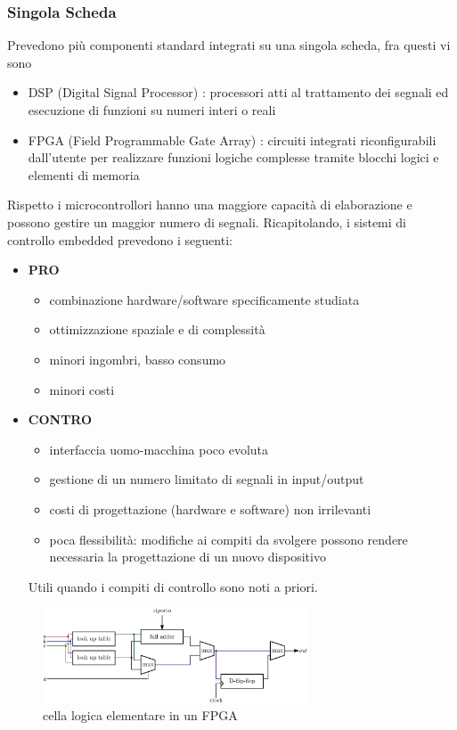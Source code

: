 \documentclass[10pt, letterpaper]{report}
\begin{document}
\subsubsection{Singola Scheda}
Prevedono più componenti standard integrati su una singola scheda, fra questi vi sono\begin{itemize}
    \item DSP (Digital Signal Processor) : processori atti al trattamento dei segnali ed esecuzione di funzioni su numeri interi o reali 
    \item FPGA (Field Programmable Gate Array) : circuiti integrati riconfigurabili dall’utente per realizzare 
    funzioni logiche complesse tramite blocchi logici e elementi di memoria
\end{itemize}
Rispetto i microcontrollori hanno una maggiore capacità di elaborazione e possono gestire un maggior numero 
di segnali.\acc 
Ricapitolando, i sistemi di controllo embedded prevedono i seguenti:\begin{itemize}
    \item \textbf{PRO}\begin{itemize}
        \item combinazione hardware/software specificamente studiata 
        \item ottimizzazione spaziale e di complessità
        \item minori ingombri, basso consumo 
        \item minori costi
    \end{itemize}
    \item \textbf{CONTRO}\begin{itemize}
        \item interfaccia uomo-macchina poco evoluta
        \item  gestione di un numero limitato di segnali in input/output 
        \item  costi di progettazione (hardware e software) non irrilevanti 
        \item poca flessibilità: modifiche ai compiti da svolgere possono 
        rendere necessaria la progettazione di un nuovo dispositivo 
    \end{itemize}
    Utili quando i compiti di controllo sono noti a priori.
\end{itemize}
\begin{figure}[h!]
    \centering
    \includegraphics[width=0.7\textwidth ]{images/cellaLogica.eps}
    \caption{cella logica elementare in un FPGA}
\end{figure}
\end{document}
